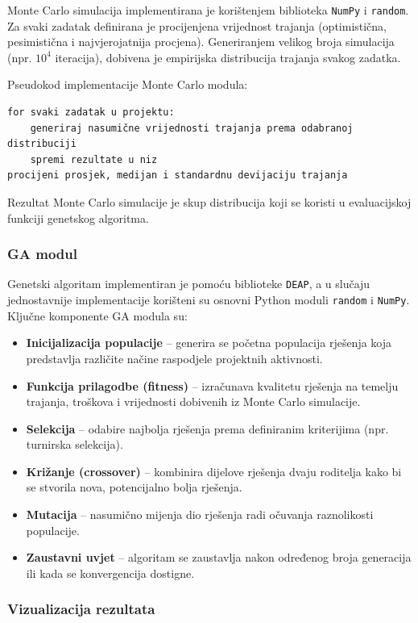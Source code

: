 Monte Carlo simulacija implementirana je korištenjem biblioteka \texttt{NumPy} i \texttt{random}. Za svaki zadatak definirana je procijenjena vrijednost trajanja (optimistična, pesimistična i najvjerojatnija procjena). Generiranjem velikog broja simulacija (npr. $10^4$ iteracija), dobivena je empirijska distribucija trajanja svakog zadatka.

Pseudokod implementacije Monte Carlo modula:
\begin{verbatim}
for svaki zadatak u projektu:
    generiraj nasumične vrijednosti trajanja prema odabranoj distribuciji
    spremi rezultate u niz
procijeni prosjek, medijan i standardnu devijaciju trajanja
\end{verbatim}

Rezultat Monte Carlo simulacije je skup distribucija koji se koristi u evaluacijskoj funkciji genetskog algoritma.


\subsubsection{GA modul}

Genetski algoritam implementiran je pomoću biblioteke \texttt{DEAP}, a u slučaju jednostavnije implementacije korišteni su osnovni Python moduli \texttt{random} i \texttt{NumPy}. Ključne komponente GA modula su:
\begin{itemize}
    \item \textbf{Inicijalizacija populacije} -- generira se početna populacija rješenja koja predstavlja različite načine raspodjele projektnih aktivnosti.
    \item \textbf{Funkcija prilagodbe (fitness)} -- izračunava kvalitetu rješenja na temelju trajanja, troškova i vrijednosti dobivenih iz Monte Carlo simulacije.
    \item \textbf{Selekcija} -- odabire najbolja rješenja prema definiranim kriterijima (npr. turnirska selekcija).
    \item \textbf{Križanje (crossover)} -- kombinira dijelove rješenja dvaju roditelja kako bi se stvorila nova, potencijalno bolja rješenja.
    \item \textbf{Mutacija} -- nasumično mijenja dio rješenja radi očuvanja raznolikosti populacije.
    \item \textbf{Zaustavni uvjet} -- algoritam se zaustavlja nakon određenog broja generacija ili kada se konvergencija dostigne.
\end{itemize}

\subsubsection{Vizualizacija rezultata}

